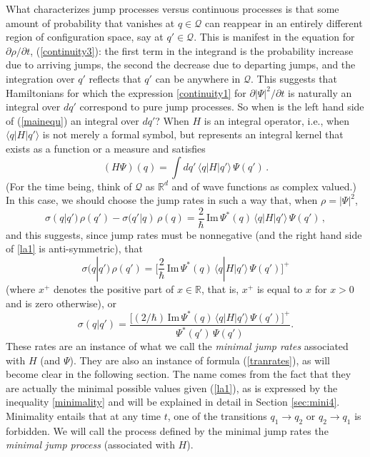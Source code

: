 \documentclass[12pt]{article}
\newcommand{\RRR}{\mathbb{R}} %
\newcommand{\1}{\mathbf{1}} %
\renewcommand{\Im}{\mathrm{Im}} %
\renewcommand{\sp}[2]{\langle #1 | #2 \rangle} %
\newcommand{\conf}{\mathcal{Q}} %
\begin{document}
What characterizes jump processes versus continuous processes is that
some amount of probability that vanishes at $q\in\conf$ can reappear
in an entirely different region of configuration space, say at
$q'\in\conf$. This is manifest in the equation for $\partial
\rho/\partial t$, (\ref{continuity3}): the first term in the integrand
is the probability increase due to arriving jumps, the second the
decrease due to departing jumps, and the integration over $q'$
reflects that $q'$ can be anywhere in $\conf$. This suggests that
Hamiltonians for which the expression \eqref{continuity1} for
$\partial |\Psi|^2/\partial t$ is naturally an integral over $dq'$
correspond to pure jump processes. So when is the left hand side of
(\ref{mainequ}) an integral over $dq'$?  When $H$ is an integral
operator, i.e., when $\sp{q}{H|q'}$ is not merely a formal symbol, but
represents an integral kernel that exists as a function or a measure and
satisfies
\begin{equation}
   (H\Psi)(q) = \int dq'\,\sp{q}{H|q'}\, \Psi(q')\,.
\end{equation}
(For the time being, think of $\conf$ as $\RRR^d$ and of wave
functions as complex valued.) In this case, we should choose the jump
rates in such a way that, when $\rho = |\Psi|^2$,
\begin{equation}\label{la1}
   \sigma(q|q') \,\rho(q') - \sigma(q'|q) \,\rho(q) = \frac{2}{\hbar}
   \, \Im \, \Psi^*(q)\, \sp{q}{H|q'} \, \Psi(q') \,,
\end{equation}
and this suggests, since jump rates must be nonnegative (and the right
hand side of \eqref{la1} is anti-symmetric), that
\[
   \sigma(q|q') \,\rho(q') = \Big[ \frac{2}{\hbar} \, \Im \,
   \Psi^*(q)\, \sp{q}{H|q'} \, \Psi(q') \Big]^+
\]
(where $x^+$ denotes the positive part of $x\in\RRR$, that is, $x^+$ is
equal to $x $ for $x>0$ and is zero otherwise), or
\begin{equation}\label{mini1}
   \sigma(q|q') = \frac{ \big[ (2/\hbar) \, \Im \, \Psi^*(q) \, \sp{q}
   {H|q'} \, \Psi(q') \big]^+}{\Psi^*(q')\, \Psi(q')} .
\end{equation}
These rates are an instance of what we call the \emph{minimal jump
rates} associated with $H$ (and $\Psi$).  They are also an instance of
formula (\ref{tranrates}), as will become clear in the following
section.  The name comes from the fact that they are actually the
minimal possible values given (\ref{la1}), as is expressed by the
inequality \eqref{minimality} and will be explained in detail in
Section \ref{sec:mini4}.  Minimality entails that at any time $t$, one
of the transitions $q_1 \to q_2$ or $q_2 \to q_1$ is forbidden. We
will call the process defined by the minimal jump rates the
\emph{minimal jump process} (associated with $H$).
\end{document}
